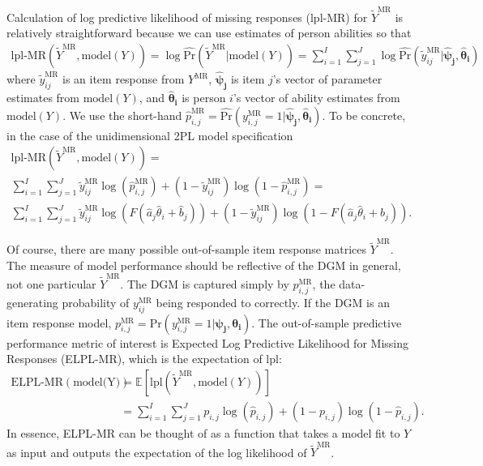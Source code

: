 \documentclass[
  english,
  man,floatsintext]{apa7}
\begin{document}
Calculation of log predictive likelihood of missing responses (lpl-MR) for \(\tilde Y^{\text{MR}}\) is relatively straightforward because we can use estimates of person abilities so that
\begin{align}
\text{lpl-MR}(\tilde Y^{\text{MR}}, \text{model}(Y)) = \log \hat{\text{Pr}}(\tilde Y^{\text{MR}} | \text{model}(Y)) = \sum_{i=1}^{I} \sum_{j=1}^{J} \log \hat{\text{Pr}}(\tilde y_{ij}^{\text{MR}} | \bm{\hat\psi_j}, \bm{\hat\theta_i})
\end{align}
where \(\tilde y_{ij}^{\text{MR}}\) is an item response from \(Y^{\text{MR}}\), \(\bm{\hat\psi_j}\) is item \(j\)'s vector of parameter estimates from \(\text{model}(Y)\), and \(\bm{\hat\theta_i}\) is person \(i\)'s vector of ability estimates from \(\text{model}(Y)\). We use the short-hand \(\hat p_{i, j}^{\text{MR}} = \hat{\text{Pr}}(y_{i, j}^{\text{MR}} = 1 | \bm{\hat\psi_j}, \bm{\hat\theta_i})\). To be concrete, in the case of the unidimensional 2PL model specification
\begin{align}
\text{lpl-MR}(\tilde Y^{\text{MR}}, \text{model}(Y)) = \\ \sum_{i=1}^{I} \sum_{j=1}^{J} \tilde y_{ij}^{\text{MR}} \log \left(\hat p_{i, j}^{\text{MR}}\right) + (1 - \tilde y_{ij}^{\text{MR}})\log\left(1 - \hat p_{i, j}^{\text{MR}}\right) = \\\sum_{i=1}^{I} \sum_{j=1}^{J} \tilde y_{ij}^{\text{MR}} \log \left(F(\hat a_j\hat \theta_i + \hat b_j)\right) + (1 - \tilde y_{ij}^{\text{MR}})\log\left(1 - F(\hat a_j\hat \theta_i + \hat b_j)\right).
\end{align}

Of course, there are many possible out-of-sample item response matrices \(\tilde Y^{\text{MR}}\). The measure of model performance should be reflective of the DGM in general, not one particular \(\tilde Y^{\text{MR}}\). The DGM is captured simply by \(p_{i, j}^{\text{MR}}\), the data-generating probability of \(y_{ij}^{\text{MR}}\) being responded to correctly. If the DGM is an item response model, \(p_{i, j}^{\text{MR}} = \text{Pr}(y_{i, j}^{\text{MR}} = 1 | \bm{\psi_j}, \bm{\theta_i})\). The out-of-sample predictive performance metric of interest is Expected Log Predictive Likelihood for Missing Responses (ELPL-MR), which is the expectation of lpl:
\begin{align}
\text{ELPL-MR}(\text{model(Y)}) &= \mathbb{E}\left[\text{lpl}(\tilde Y^{\text{MR}}, \text{model}(Y))\right] \\ &= \sum_{i=1}^{I} \sum_{j=1}^{J} p_{i, j} \log (\hat p_{i, j}) + (1 - {p_{i, j}})\log(1 - \hat p_{i, j}) \label{eq:elplmr2}.
\end{align}
In essence, ELPL-MR can be thought of as a function that takes a model fit to \(Y\) as input and outputs the expectation of the log likelihood of \(\tilde Y^{\text{MR}}\).
\end{document}
